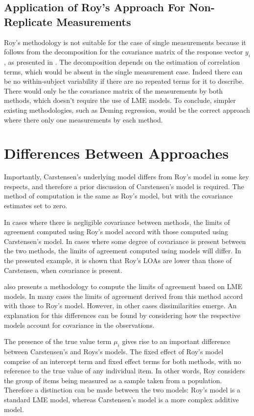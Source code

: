 \documentclass[12pt, a4paper]{report}
\theoremstyle{plain}
\theoremstyle{definition}
\theoremstyle{remark}
\begin{document}
\subsection{Application of Roy's Approach For Non-Replicate Measurements}

Roy's methodology is not suitable for the case of single measurements because it follows from the decomposition for the covariance matrix of the response vector $y_{i}$, as presented in \citet{hamlett}. The decomposition depends on the estimation of correlation terms, which would be absent in the single measurement case. Indeed there can be no within-subject variability if there are no repeated terms for it to describe. There would only be the covariance matrix of the measurements by both methods, which doesn't require the use of LME models. To conclude, simpler existing methodologies, such as Deming regression, would be the correct approach where there only one measurements by each method.


\section{Differences Between Approaches}


Importantly, Carstensen's underlying model differs from Roy's model in some key respects, and therefore a prior discussion of Carstensen's model is required. The method of computation is the
same as Roy's model, but with the covariance estimates set to zero.



In cases where there is negligible covariance between methods, the limits of agreement computed using Roy's model accord with those computed using Carstensen's model. In cases where some degree of
covariance is present between the two methods, the limits of agreement computed using models will differ. In the presented
example, it is shown that Roy's LOAs are lower than those of Carstensen, when covariance is present.

\citet{BXC2008} also presents a methodology to compute the limits of agreement based on LME models. In many cases the limits of agreement derived from this method accord with those to Roy's model. However, in other cases dissimilarities emerge. An explanation for this differences can be found by considering how the respective models account for covariance in the observations.

The presence of the true value term $\mu_i$ gives rise to an important difference between Carstensen's and Roys's models. The fixed effect of Roy's model comprise of an intercept term and fixed effect terms for both methods, with no reference to the true value of any individual item. In other words, Roy considers the group of items being measured as a sample taken from a population. Therefore a distinction can be made between the two models: Roy's model is a standard LME model, whereas Carstensen's model is a more complex additive model.
\end{document}
